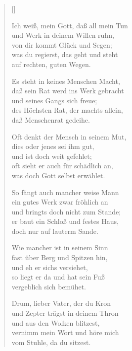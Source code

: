 \begin{multicols}{2}
\settowidth{\versewidth}{Ich weiß, mein Gott, das all mein Tun}
\begin{verse}[\versewidth]

 Ich weiß, mein Gott, daß all mein Tun\\
und Werk in deinem Willen ruhn,\\
von dir kommt Glück und Segen;\\
was du regierst, das geht und steht\\
auf rechten, guten Wegen.

 Es steht in keines Menschen Macht,\\
daß sein Rat werd ins Werk gebracht\\
und seines Gangs sich freue;\\
des Höchsten Rat, der machts allein,\\
daß Menschenrat gedeihe.

 Oft denkt der Mensch in seinem Mut,\\
dies oder jenes sei ihm gut,\\
und ist doch weit gefehlet;\\
oft sieht er auch für schädlich an,\\
was doch Gott selbst erwählet.

 So fängt auch mancher weise Mann\\
ein gutes Werk zwar fröhlich an\\
und bringts doch nicht zum Stande;\\
er baut ein Schloß und festes Haus,\\
doch nur auf lauterm Sande.

 Wie mancher ist in seinem Sinn\\
fast über Berg und Spitzen hin,\\
und eh er sichs versiehet,\\
so liegt er da und hat sein Fuß\\
vergeblich sich bemühet.

 Drum, lieber Vater, der du Kron\\
und Zepter trägst in deinem Thron\\
und aus den Wolken blitzest,\\
vernimm mein Wort und höre mich\\
vom Stuhle, da du sitzest.


\end{verse}
\end{multicols}
